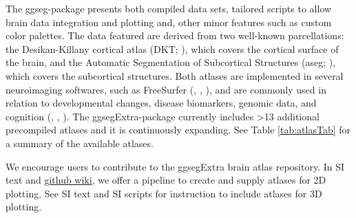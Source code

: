 \documentclass[fleqn,10pt]{wlpeerj} %
\begin{document}
The ggseg-package presents both compiled data sets, tailored scripts to allow brain data integration and plotting and, other minor features such as custom color palettes.
The data featured are derived from two well-known parcellations: the Desikan-Killany cortical atlas (DKT; \citet{dkt}), which covers the cortical surface of the brain, and the Automatic Segmentation of Subcortical Structures (aseg; \citet{aseg}), which covers the subcortical structures.
Both atlases are implemented in several neuroimaging softwares, such as FreeSurfer (\citet{fischl_99}, \citet{dale_99}, \citet{Fischl2000}), and are commonly used in relation to developmental changes, disease biomarkers, genomic data, and cognition (\citet{amlien_elaboration_2019}, \citet{WALHOVD20051261}, \citet{Pizzagalli}).
The ggsegExtra-package currently includes \textgreater{}13 additional precompiled atlases and it is continuously expanding.
See Table \ref{tab:atlasTab} for a summary of the available atlases.

We encourage users to contribute to the ggsegExtra brain atlas repository.
In SI text and \href{https://github.com/LCBC-UiO/ggseg/wiki}{github wiki}, we offer a pipeline to create and supply atlases for 2D plotting.
See SI text and SI scripts for instruction to include atlases for 3D plotting.
\end{document}
